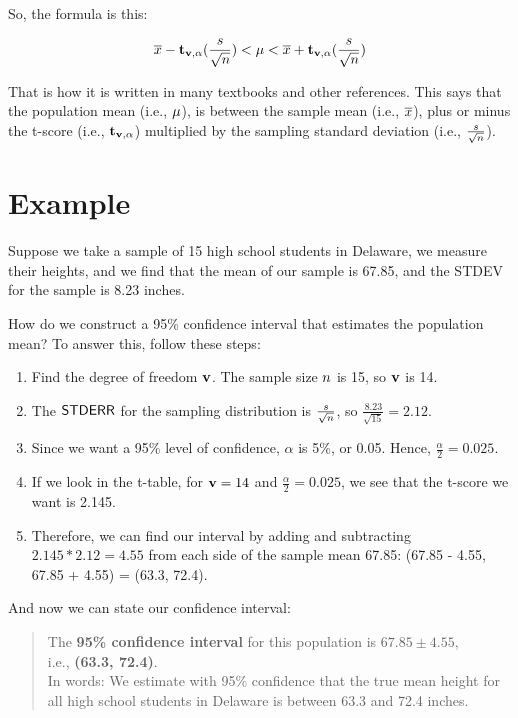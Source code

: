 \documentclass[../../../main.tex]{subfiles}
\begin{document}
\noindent
So, the formula is this:

\begin{equation*}
  \samplemean{x} - \tscore/(\frac{\samplestdev}{\sqrt{\samplesize/}}) < \populationmean < \samplemean{x} + \tscore/(\frac{\samplestdev}{\sqrt{\samplesize/}})
\end{equation*}

\noindent
That is how it is written in many textbooks and other references. This says that the population mean (i.e., $\mu$), is between the sample mean (i.e., $\overline{x}$), plus or minus the t-score (i.e., $\tscore/$) multiplied by the sampling standard deviation (i.e., $\frac{\samplestdev}{\sqrt{\samplesize/}}$).


\section{Example}

Suppose we take a sample of 15 high school students in Delaware, we measure their heights, and we find that the mean of our sample is 67.85, and the STDEV for the sample is 8.23 inches. 

How do we construct a 95\% confidence interval that estimates the population mean? To answer this, follow these steps:

\begin{enumerate}

  \item Find the degree of freedom $\DegFreedom/$. The sample size $\samplesize/$ is 15, so $\DegFreedom/$ is 14.

  \item The $\StdErr/$ for the sampling distribution is $\frac{\samplestdev}{\sqrt{\samplesize/}}$, so $\frac{8.23}{\sqrt{15}} = 2.12$.

  \item Since we want a 95\% level of confidence, $\alpha$ is 5\%, or 0.05. Hence, $\frac{\alpha}{2} = 0.025$. 

  \item If we look in the t-table, for $\DegFreedom/ = 14$ and $\frac{\alpha}{2} = 0.025$, we see that the t-score we want is 2.145.

  \item Therefore, we can find our interval by adding and subtracting $2.145 * 2.12 = 4.55$ from each side of the sample mean 67.85: (67.85 - 4.55, 67.85 + 4.55) = (63.3, 72.4). 

\end{enumerate}

\noindent
And now we can state our confidence interval:

\begin{quote}
  The \textbf{95\% confidence interval} for this population is $\mathbf{67.85 \pm 4.55}$, \\
  i.e., \textbf{(63.3, 72.4)}. \\

  In words: We estimate with 95\% confidence that the true mean height for all high school students in Delaware is between 63.3 and 72.4 inches.
\end{quote}
\end{document}
